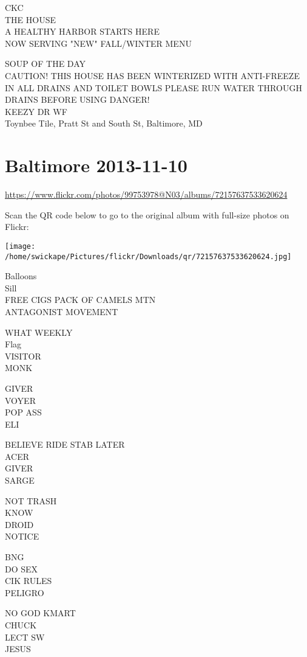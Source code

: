 \documentclass[10pt,letterpaper]{article}
\begin{document}
CKC\\
THE HOUSE\\
A HEALTHY HARBOR STARTS HERE\\
NOW SERVING "NEW" FALL/WINTER MENU

SOUP OF THE DAY\\
CAUTION! THIS HOUSE HAS BEEN WINTERIZED WITH ANTI{-}FREEZE IN ALL DRAINS AND TOILET BOWLS PLEASE RUN WATER THROUGH DRAINS BEFORE USING DANGER!\\
KEEZY DR WF\\
Toynbee Tile, Pratt St and South St, Baltimore, MD


\section*{Baltimore 2013-11-10}

\url{https://www.flickr.com/photos/99753978@N03/albums/72157637533620624}

Scan the QR code below to go to the original album with full-size photos on Flickr:

\texttt{[image: /home/swickape/Pictures/flickr/Downloads/qr/72157637533620624.jpg]}


Balloons\\
Sill\\
FREE CIGS PACK OF CAMELS MTN\\
ANTAGONIST MOVEMENT

WHAT WEEKLY\\
Flag\\
VISITOR\\
MONK

GIVER\\
VOYER\\
POP ASS\\
ELI

BELIEVE RIDE STAB LATER\\
ACER\\
GIVER\\
SARGE

NOT TRASH\\
KNOW\\
DROID\\
NOTICE

BNG\\
DO SEX\\
CIK RULES\\
PELIGRO

NO GOD KMART\\
CHUCK\\
LECT SW\\
JESUS
\end{document}
